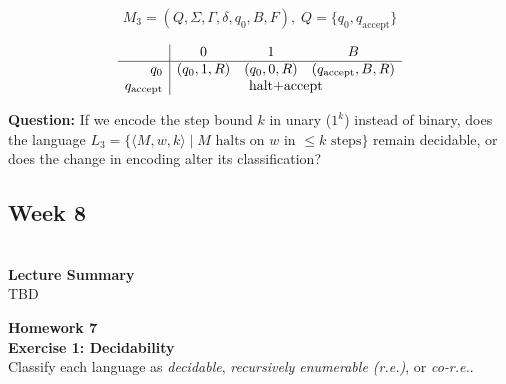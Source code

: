 \documentclass{article}
\theoremstyle{theorem}
\theoremstyle{definition}
\theoremstyle{remark}
\begin{document}
\begin{enumerate}
        \[
          M_3 = (Q,\Sigma,\Gamma,\delta,q_0,B,F),\;
          Q=\{q_0,q_{\mathrm{accept}}\}
        \]

        \[
        \begin{array}{r|ccc}
                 & 0          & 1          & B \\ \hline
        q_0      & (q_0,1,R)  & (q_0,0,R)  & (q_{\mathrm{accept}},B,R)\\
        q_{\mathrm{accept}} & \multicolumn{3}{c}{\text{halt+accept}}\\
        \end{array}
        \]
\end{enumerate}

    \textbf{Question: }If we encode the step bound \(k\) in unary (\(1^{k}\)) instead of binary, does the language  
        \(L_{3} = \{\langle M,w,k\rangle \mid M \text{ halts on } w \text{ in } \le k \text{ steps}\}\)  
        remain decidable, or does the change in encoding alter its classification?  

\subsection{\textbf{Week 8}}\\
\textbf{Lecture Summary}\\
TBD

\textbf{Homework 7}\\
\textbf{Exercise 1: Decidability}\\
Classify each language as \emph{decidable}, \emph{recursively enumerable (r.e.)}, or \emph{co‑r.e.}. 
\end{document}
